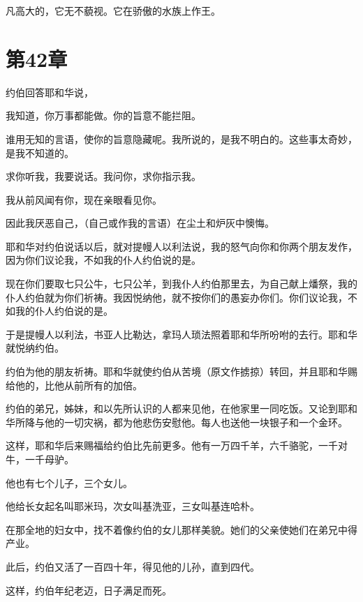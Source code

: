 \documentclass[12pt,oneside]{book}
\begin{document}
凡高大的，它无不藐视。它在骄傲的水族上作王。


\chapter{第42章}
约伯回答耶和华说，

我知道，你万事都能做。你的旨意不能拦阻。

谁用无知的言语，使你的旨意隐藏呢。我所说的，是我不明白的。这些事太奇妙，是我不知道的。

求你听我，我要说话。我问你，求你指示我。

我从前风闻有你，现在亲眼看见你。

因此我厌恶自己，（自己或作我的言语）在尘土和炉灰中懊悔。

耶和华对约伯说话以后，就对提幔人以利法说，我的怒气向你和你两个朋友发作，因为你们议论我，不如我的仆人约伯说的是。

现在你们要取七只公牛，七只公羊，到我仆人约伯那里去，为自己献上燔祭，我的仆人约伯就为你们祈祷。我因悦纳他，就不按你们的愚妄办你们。你们议论我，不如我的仆人约伯说的是。

于是提幔人以利法，书亚人比勒达，拿玛人琐法照着耶和华所吩咐的去行。耶和华就悦纳约伯。

约伯为他的朋友祈祷。耶和华就使约伯从苦境（原文作掳掠）转回，并且耶和华赐给他的，比他从前所有的加倍。

约伯的弟兄，姊妹，和以先所认识的人都来见他，在他家里一同吃饭。又论到耶和华所降与他的一切灾祸，都为他悲伤安慰他。每人也送他一块银子和一个金环。

这样，耶和华后来赐福给约伯比先前更多。他有一万四千羊，六千骆驼，一千对牛，一千母驴。

他也有七个儿子，三个女儿。

他给长女起名叫耶米玛，次女叫基洗亚，三女叫基连哈朴。

在那全地的妇女中，找不着像约伯的女儿那样美貌。她们的父亲使她们在弟兄中得产业。

此后，约伯又活了一百四十年，得见他的儿孙，直到四代。

这样，约伯年纪老迈，日子满足而死。
\end{document}
